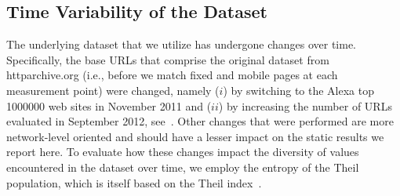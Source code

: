 \documentclass[journal,final]{IEEEtran}
\begin{document}
\subsection{Time Variability of the Dataset}
The underlying dataset that we utilize has undergone changes over time. 
Specifically, the base URLs that comprise the original dataset from httparchive.org (i.e., before we match fixed and mobile pages at each measurement point) were changed, namely ($i$) by switching to the Alexa top 1000000 web sites in November 2011 and ($ii$) by increasing the number of URLs evaluated in September 2012, see~\cite{ht13}. Other changes that were performed are more network-level oriented and should have a lesser impact on the static results we report here.
To evaluate how these changes impact the diversity of values encountered in the dataset over time, we employ the entropy of the Theil population, which is itself based on the Theil index~\cite{Th72}.
\end{document}
